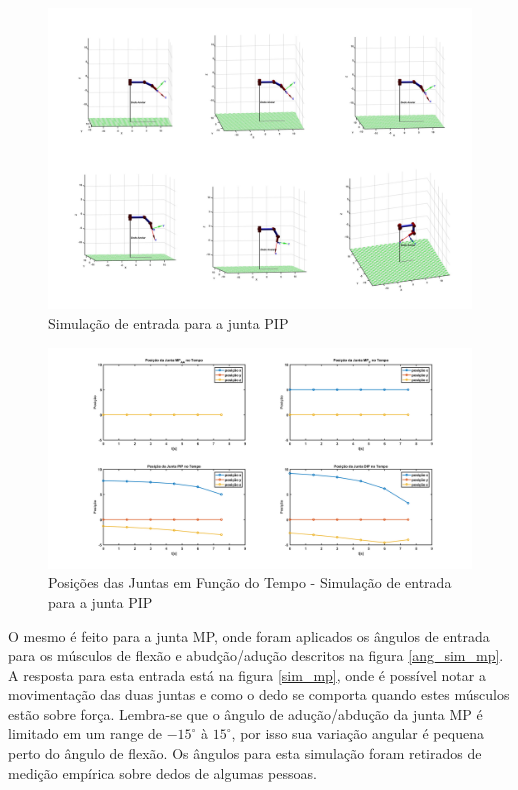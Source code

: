 \begin{figure}[H]
\centering
\includegraphics[width = 1\textwidth]{img/simpip.png}
\caption[Simulação de entrada para a junta PIP]{Simulação de entrada para a junta PIP}
\label{sim_pip}
\end{figure}

\begin{figure}[H]
\centering
\includegraphics[width = 1\textwidth]{img/posicoes_pip.png}
\caption[Posições das Juntas em Função do Tempo - Simulação de entrada para a junta PIP]{Posições das Juntas em Função do Tempo - Simulação de entrada para a junta PIP}
\end{figure}

O mesmo é feito para a junta MP, onde foram aplicados os ângulos de entrada para os músculos de flexão e abudção/adução descritos na figura \ref{ang_sim_mp}. A resposta para esta entrada está na figura \ref{sim_mp}, onde é possível notar a movimentação das duas juntas e como o dedo se comporta quando estes músculos estão sobre força. Lembra-se que o ângulo de adução/abdução da junta MP é limitado em um range de $-15^\circ$ à $15^\circ$, por isso sua variação angular é pequena perto do ângulo de flexão. Os ângulos para esta simulação foram retirados de medição empírica sobre dedos de algumas pessoas.

